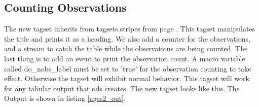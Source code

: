\subsection{Counting Observations}
The new tagset inherits from tagsets.stripes from page \pageref{striped}. 
This tagset manipulates the title and prints it as a heading. 
We also add a counter for the observations, and a stream to catch
the table while the observations are being counted.  The last thing is to add
an event to print the observation count.
A macro variable called do\_nobs\_label must be set to 'true' for the observation
counting to take effect.  Otherwise the tagset will exhibit normal behavior.
This tagset will work for any tabular output that ods creates.  
The new tagset looks like this.  
The Output is shown in listing \vref{ages2_out}.

